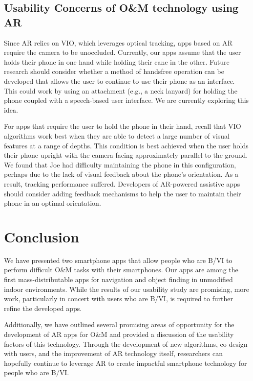 \documentclass[chi_draft]{sigchi}
\newcommand{\BVI}{B/VI\xspace}
\newcommand{\OM}{O\&M\xspace}
\begin{document}
\subsection{Usability Concerns of \OM technology using AR}
Since AR relies on VIO, which leverages optical tracking, apps based on AR require the camera to be unoccluded.  Currently, our apps assume that the user holds their phone in one hand while holding their cane in the other.  Future research should consider whether a method of handsfree operation can be developed that allows the user to continue to use their phone as an interface.  This could work by using an attachment (e.g., a neck lanyard) for holding the phone coupled with a speech-based user interface.  We are currently exploring this idea.

For apps that require the user to hold the phone in their hand, recall that VIO algorithms work best when they are able to detect a large number of visual features at a range of depths.  This condition is best achieved when the user holds their phone upright with the camera facing approximately parallel to the ground.  We found that Joe had difficulty maintaining the phone in this configuration, perhaps due to the lack of visual feedback about the phone's orientation.  As a result, tracking performance suffered.  Developers of AR-powered assistive apps should consider adding feedback mechanisms to help the user to maintain their phone in an optimal orientation. 
\balance{}

\section{Conclusion}
We have presented two smartphone apps that allow people who are \BVI to perform difficult \OM tasks with their smartphones.  Our apps are among the first mass-distributable apps for navigation and object finding in unmodified indoor environments.  While the results of our usability study are promising, more work, particularly in concert with users who are \BVI, is required to further refine the developed apps.

Additionally, we have outlined several promising areas of opportunity for the development of AR apps for \OM and provided a discussion of the usability factors of this technology.  Through the development of new algorithms, co-design with users, and the improvement of AR technology itself, researchers can hopefully continue to leverage AR to create impactful smartphone technology for people who are \BVI.  
%


\newpage


\end{document}
